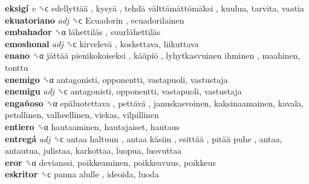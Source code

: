 \textbf{eksigí} \emph{v}  ␝ϲ   edellyttää ,  kysyä ,  tehdä välttämättömäksi , kuulua, tarvita, vaatia  \\
\textbf{ekuatoriano} \emph{adj}  ␝ϲ   Ecuadorin , ecuadorilainen  \\
\textbf{embahador} ␝α   lähettiläs ,  suurlähettiläs   \\
\textbf{emoshonal} \emph{adj}  ␝ϲ   kirvelevä , koskettava, liikuttava  \\
\textbf{enano} ␝α   jättää pienikokoiseksi ,  kääpiö ,  lyhytkasvuinen ihminen , maahinen, tonttu  \\
\textbf{enemigo} ␝α  antagonisti, opponentti, vastapuoli, vastustaja  \\
\textbf{enemigu} \emph{adj}  ␝ϲ  antagonisti, opponentti, vastapuoli, vastustaja  \\
\textbf{engañoso} ␝α   epäluotettava ,  pettävä , januskasvoinen, kaksinaamainen, kavala, petollinen, valheellinen, viekas, vilpillinen  \\
\textbf{entiero} ␝α  hautaaminen, hautajaiset, hautaus  \\
\textbf{entregá} \emph{adj}  ␝ϲ   antaa haltuun ,  antaa käsiin ,  esittää ,  pitää puhe , antaa, antautua, julistaa, karkottaa, luopua, luovuttaa  \\
\textbf{eror} ␝α  devianssi, poikkeaminen, poikkeavuus, poikkeus  \\
\textbf{eskritor} ␝ϲ   panna alulle , ideoida, luoda  \\
